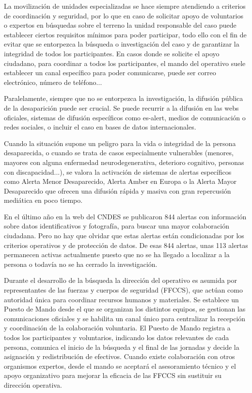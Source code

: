     La movilización de unidades especializadas se hace siempre atendiendo a criterios de coordinación y seguridad, por lo que en caso de solicitar apoyo de voluntarios o expertos en búsquedas sobre el terreno la unidad responsable del caso puede establecer ciertos requisitos mínimos para poder participar, todo ello con el fin de evitar que se entorpezca la búsqueda o investigación del caso y de garantizar la integridad de todos los participantes. En casos donde se solicite el apoyo ciudadano, para coordinar a todos los participantes, el mando del operativo suele establecer un canal específico para poder comunicarse, puede ser correo electrónico, número de teléfono...
    
    Paralelamente, siempre que no se entorpezca la investigación, la difusión pública de la desaparición puede ser crucial. Se puede recurrir a la difusión en las webs oficiales, sistemas de difusión específicos como es-alert, medios de comunicación o redes sociales, o incluir el caso en bases de datos internacionales.  
    
    Cuando la situación supone un peligro para la vida o integridad de la persona desaparecida, o cuando se trata de casos especialmente vulnerables (menores, mayores con alguna enfermedad neurodegenerativa, deterioro cognitivo, personas con discapacidad...), se valora la activación de sistemas de alertas específicos como Alerta Menor Desaparecido, Alerta Amber en Europa o la Alerta Mayor Desaparecido que ofrecen una difusión rápida y masiva con gran repercusión mediática en poco tiempo. 
    
    En el último año en la web del CNDES se publicaron 844 alertas con información sobre datos identificativos y fotografía, para buscar una mayor colaboración ciudadana. Pero no hay que olvidar que estas alertas están condicionadas por los criterios operativos y de protección de datos. De esas 844 alertas, unas 113 alertas permanecen activas actualmente puesto que no se ha llegado a localizar a la persona o todavía no se ha cerrado la investigación.
  
    
    Durante el desarrollo de la búsqueda la dirección del operativo es asumida por representantes de las fuerzas y cuerpos de seguridad (FFCCS), que actúan como autoridad única para coordinar recursos humanos y materiales. Se establece un Puesto de Mando desde el que se organizan los distintos equipos, se gestionan las comunicaciones oficiales y se habilita un canal único para centralizar la recepción y coordinación de la colaboración voluntaria. El Puesto de Mando registra a todos los participantes y voluntarios, indicando los datos relevantes de cada persona, comunica el inicio de la búsqueda y el final de las jornadas y decide la asignación y redistribución de efectivos. Cuando existe colaboración con otros organismos expertos, desde el mando se aceptará el asesoramiento técnico y el apoyo organizativo para mejorar la eficacia de las FFCCS sin sustituir su dirección operativa.
    
